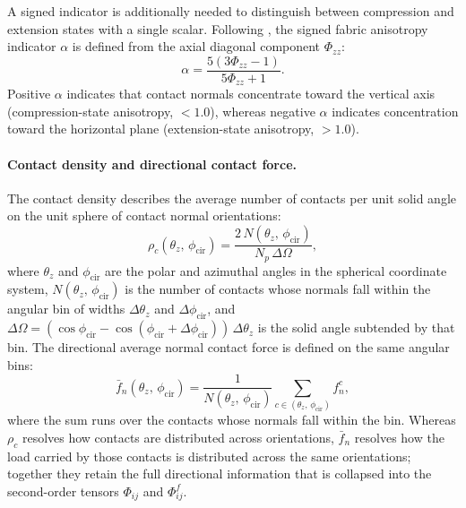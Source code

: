\documentclass[../main]{subfiles}
\begin{document}
A signed indicator is additionally needed to distinguish between compression and extension states with a single scalar. Following \citet{Otsubo2022}, the signed fabric anisotropy indicator $\alpha$ \citep{YimsiriSoga2010} is defined from the axial diagonal component $\Phi_{zz}$:
\begin{equation}
\alpha = \frac{5(3\Phi_{zz} - 1)}{5\Phi_{zz} + 1}.
\label{eq:ch4_alpha}
\end{equation}
Positive $\alpha$ indicates that contact normals concentrate toward the vertical axis (compression-state anisotropy, \Kzero{} $< 1.0$), whereas negative $\alpha$ indicates concentration toward the horizontal plane (extension-state anisotropy, \Kzero{} $> 1.0$).

\paragraph{Contact density and directional contact force.}
The contact density \citep{Han2023} describes the average number of contacts per unit solid angle on the unit sphere of contact normal orientations:
\begin{equation}
\rho_c(\theta_z,\,\phi_{\mathrm{cir}}) = \frac{2\,N(\theta_z,\,\phi_{\mathrm{cir}})}{N_p\,\Delta\Omega},
\label{eq:ch4_contact_density}
\end{equation}
where $\theta_z$ and $\phi_{\mathrm{cir}}$ are the polar and azimuthal angles in the spherical coordinate system, $N(\theta_z,\,\phi_{\mathrm{cir}})$ is the number of contacts whose normals fall within the angular bin of widths $\Delta\theta_z$ and $\Delta\phi_{\mathrm{cir}}$, and $\Delta\Omega = (\cos\phi_{\mathrm{cir}} - \cos(\phi_{\mathrm{cir}}+\Delta\phi_{\mathrm{cir}}))\,\Delta\theta_z$ is the solid angle subtended by that bin. The directional average normal contact force is defined on the same angular bins:
\begin{equation}
\bar{f}_n(\theta_z,\,\phi_{\mathrm{cir}}) = \frac{1}{N(\theta_z,\,\phi_{\mathrm{cir}})} \sum_{c \in (\theta_z,\,\phi_{\mathrm{cir}})} f_n^c,
\label{eq:ch4_fn_directional}
\end{equation}
where the sum runs over the contacts whose normals fall within the bin. Whereas $\rho_c$ resolves how contacts are distributed across orientations, $\bar{f}_n$ resolves how the load carried by those contacts is distributed across the same orientations; together they retain the full directional information that is collapsed into the second-order tensors $\Phi_{ij}$ and $\Phi^f_{ij}$.
\end{document}
